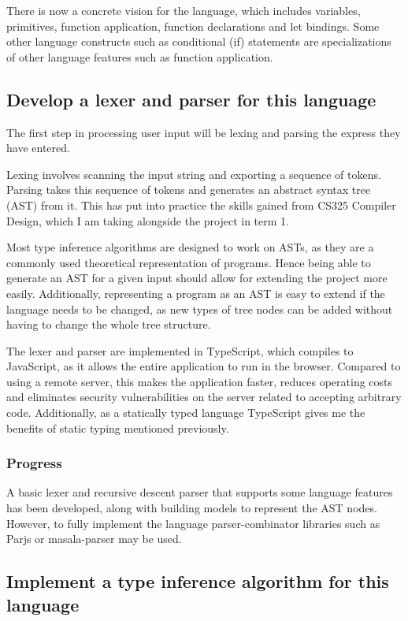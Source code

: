 \documentclass[12pt]{article}
\begin{document}
There is now a concrete vision for the language, which includes variables, primitives, function application, function declarations and let bindings. Some other language constructs such as conditional (if) statements are specializations of other language features such as function application.

\subsection{Develop a lexer and parser for this language}

The first step in processing user input will be lexing and parsing the express they have entered.

Lexing involves scanning the input string and exporting a sequence of tokens. Parsing takes this sequence of tokens and generates an abstract syntax tree (AST) from it. This has put into practice the skills gained from CS325 Compiler Design, which I am taking alongside the project in term 1.

Most type inference algorithms are designed to work on ASTs, as they are a commonly used theoretical representation of programs. Hence being able to generate an AST for a given input should allow for extending the project more easily. Additionally, representing a program as an AST is easy to extend if the language needs to be changed, as new types of tree nodes can be added without having to change the whole tree structure.

The lexer and parser are implemented in TypeScript, which compiles to JavaScript, as it allows the entire application to run in the browser. Compared to using a remote server, this makes the application faster, reduces operating costs and eliminates security vulnerabilities on the server related to accepting arbitrary code. Additionally, as a statically typed language TypeScript gives me the benefits of static typing mentioned previously.

\subsubsection{Progress}

A basic lexer and recursive descent parser that supports some language features has been developed, along with building models to represent the AST nodes. However, to fully implement the language parser-combinator libraries such as Parjs\cite{ref12} or masala-parser\cite{ref13} may be used.

\subsection{Implement a type inference algorithm for this language}
\end{document}
